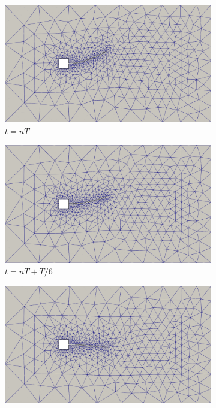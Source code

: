 \begin{figure}[h!]
    \centering
    \caption{\textit{Flutter} em painel - Configurações da malha obtidas no problema.}
    \begin{subfigure}[b]{0.49\textwidth}
        \includegraphics[width=\linewidth]{Figuras/FSI-prism2/mT1.png}
        \caption{$t=nT$}
    \end{subfigure}
    \begin{subfigure}[b]{0.49\textwidth}
        \includegraphics[width=\linewidth]{Figuras/FSI-prism2/mT2.png}
        \caption{$t=nT+T/6$}
    \end{subfigure}
    \begin{subfigure}[b]{0.49\textwidth}
        \includegraphics[width=\linewidth]{Figuras/FSI-prism2/mT3.png}

\end{subfigure}
\end{figure}
